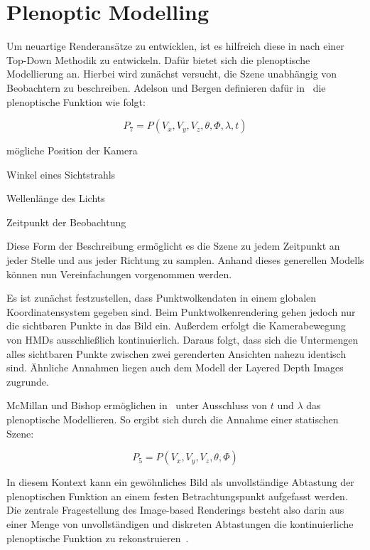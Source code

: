 \documentclass[hyperref, beleg, german]{cgvpub}
\begin{document}
\section{Plenoptic Modelling}

Um neuartige Renderansätze zu entwicklen, ist es hilfreich diese in nach einer
Top-Down Methodik zu entwickeln. Dafür bietet sich die plenoptische Modellierung
an. Hierbei wird zunächst versucht, die Szene unabhängig von Beobachtern zu
beschreiben. Adelson und Bergen definieren dafür in~\cite{adelson1991plenoptic}
die plenoptische Funktion wie folgt:

\begin{equation}
	P_7 = P(V_x, V_y, V_z, \theta, \Phi, \lambda, t)
\end{equation}

\begin{description}[style=sameline]
	\item[\( V_x, V_y, V_z \)] mögliche Position der Kamera
	\item[\( \theta, \Phi \)] Winkel eines Sichtstrahls
	\item[\( \lambda \)] Wellenlänge des Lichts
	\item[\( t \)] Zeitpunkt der Beobachtung
\end{description}

Diese Form der Beschreibung ermöglicht es die Szene zu jedem Zeitpunkt an jeder
Stelle und aus jeder Richtung zu samplen. Anhand dieses generellen Modells
können nun Vereinfachungen vorgenommen werden.

Es ist zunächst festzustellen, dass Punktwolkendaten in einem globalen
Koordinatensystem gegeben sind. Beim Punktwolkenrendering gehen jedoch nur die
sichtbaren Punkte in das Bild ein. Außerdem erfolgt die Kamerabewegung von HMDs
ausschließlich kontinuierlich. Daraus folgt, dass sich die Untermengen alles
sichtbaren Punkte zwischen zwei gerenderten Ansichten nahezu identisch sind.
Ähnliche Annahmen liegen auch dem Modell der Layered Depth Images zugrunde.

McMillan und Bishop ermöglichen in~\cite{mcmillan1995plenoptic} unter
Ausschluss von \( t \) und \( \lambda \) das plenoptische Modellieren. So
ergibt sich durch die Annahme einer statischen Szene:

\begin{equation}
	P_5 = P(V_x, V_y, V_z, \theta, \Phi)
\end{equation}

In diesem Kontext kann ein gewöhnliches Bild als unvollständige Abtastung der
plenoptischen Funktion an einem festen Betrachtungspunkt aufgefasst werden. Die
zentrale Fragestellung des Image-based Renderings besteht also darin aus einer
Menge von unvollständigen und diskreten Abtastungen die kontinuierliche
plenoptische Funktion zu rekonstruieren~\cite{mcmillan1995plenoptic}.
\end{document}
